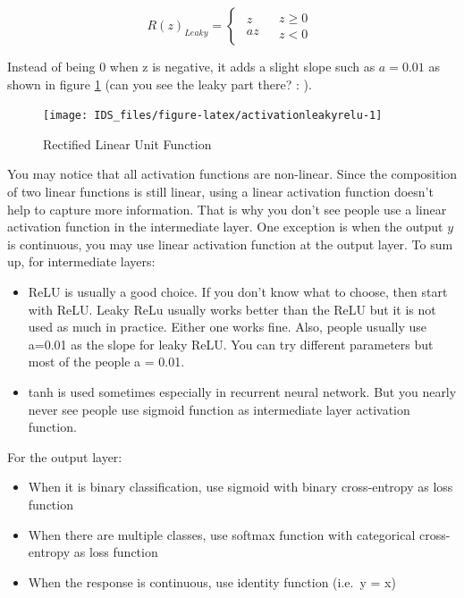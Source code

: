 \documentclass[12pt,]{krantz}
\providecommand{\tightlist}{%
  \setlength{\itemsep}{0pt}\setlength{\parskip}{0pt}}
\begin{document}
\[R(z)_{Leaky}=\begin{cases}
\begin{array}{c}
z\\
az
\end{array} & \begin{array}{c}
z\geq0\\
z<0
\end{array}\end{cases}\]

Instead of being 0 when z is negative, it adds a slight slope such as \(a=0.01\) as shown in figure \ref{fig:activationleakyrelu} (can you see the leaky part there? : ).

\begin{figure}

{\centering \texttt{[image: IDS\_files/figure-latex/activationleakyrelu-1]} 

}

\caption{Rectified Linear Unit Function}\label{fig:activationleakyrelu}
\end{figure}

You may notice that all activation functions are non-linear. Since the composition of two linear functions is still linear, using a linear activation function doesn't help to capture more information. That is why you don't see people use a linear activation function in the intermediate layer. One exception is when the output \(y\) is continuous, you may use linear activation function at the output layer. To sum up, for intermediate layers:

\begin{itemize}
\tightlist
\item
  ReLU is usually a good choice. If you don't know what to choose, then start with ReLU. Leaky ReLu usually works better than the ReLU but it is not used as much in practice. Either one works fine. Also, people usually use a=0.01 as the slope for leaky ReLU. You can try different parameters but most of the people a = 0.01.
\item
  tanh is used sometimes especially in recurrent neural network. But you nearly never see people use sigmoid function as intermediate layer activation function.
\end{itemize}

For the output layer:

\begin{itemize}
\tightlist
\item
  When it is binary classification, use sigmoid with binary cross-entropy as loss function
\item
  When there are multiple classes, use softmax function with categorical cross-entropy as loss function
\item
  When the response is continuous, use identity function (i.e.~y = x)
\end{itemize}
\end{document}
